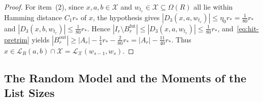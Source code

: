 \documentclass[11pt]{article}
\theoremstyle{definition}
\theoremstyle{remark}
\begin{document}
\begin{proof}
For item~(2), since $x, a, b \in \mathcal{X}$ and $w_{t_r} \in \mathcal{X} \subseteq \Omega(R)$ all lie within Hamming distance $C_1 r_*$ of $x$, the hypothesis gives $|D_3(x, a, w_{t_r})| \le \eta_0 r_* = \frac{1}{80} r_*$ and $|D_3(x, b, w_{t_r})| \le \frac{1}{80} r_*$. Hence $|I_r \setminus B_r^{\mathrm{fut}}| \le |D_3(x, a, w_{t_r})| \le \frac{1}{80} r_*$, and~\eqref{eq:hit-pretrim} yields $|B_r^{\mathrm{out}}| \ge |A_r| - \frac{1}{4} r_* - \frac{2}{80} r_* = |A_r| - \frac{11}{40} r_*$. Thus $x \in \mathcal{L}_R(a, b) \cap \mathcal{X} = \mathcal{L}_{\mathcal{X}}(w_{s-1}, w_s)$.
\end{proof}

\subsection{The Random Model and the Moments of the List Sizes}
\label{subsec:csp-moment}
\end{document}
